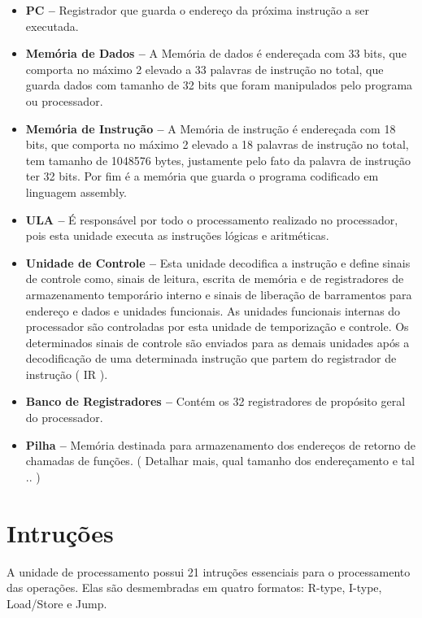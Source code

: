 \documentclass{report}
\begin{document}
  \begin{itemize}
    \item \textbf{PC --} Registrador que guarda o endereço da próxima instrução a ser executada.
    \item \textbf{Memória de Dados --} A Memória de dados é endereçada com 33 bits, que comporta no máximo 2 elevado a 33 palavras de instrução no total, que guarda dados com tamanho de 32 bits que foram manipulados pelo programa ou processador. 
    \item \textbf{Memória de Instrução --} A Memória de instrução é endereçada com 18 bits, que comporta no máximo 2 elevado a 18 palavras de instrução no total, tem tamanho de 1048576 bytes, justamente pelo fato da palavra de instrução ter 32 bits. Por fim é a memória que guarda o programa codificado em linguagem assembly.
    \item \textbf{ULA --} É responsável por todo o processamento realizado no processador, pois esta unidade executa as instruções lógicas e aritméticas.
    \item \textbf{Unidade de Controle --} Esta unidade decodifica a instrução e define sinais de controle como, sinais de leitura, escrita de memória e de registradores de armazenamento temporário interno e sinais de liberação de barramentos para endereço e dados e unidades funcionais. As unidades funcionais internas do processador são controladas por esta unidade de temporização e controle. Os determinados sinais de controle são enviados para as demais unidades após a decodificação de uma determinada instrução que partem do registrador de instrução ( IR ).
    \item \textbf{Banco de Registradores --} Contém os 32 registradores de propósito geral do processador.
    \item \textbf{Pilha --} Memória destinada para armazenamento dos endereços de retorno de chamadas de funções. ( Detalhar mais, qual tamanho dos endereçamento e tal .. ) 
  \end{itemize}
  
  \section{Intruções}
  A unidade de processamento possui 21 intruções essenciais para o processamento das operações. Elas são desmembradas em quatro formatos: R-type, I-type, Load/Store e Jump.
  
\end{document}
